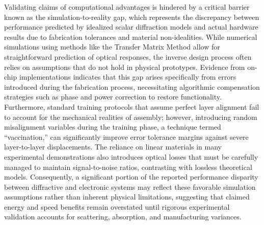 Validating claims of computational advantages is hindered by a critical barrier known as the simulation-to-reality gap, which represents the discrepancy between performance predicted by idealized scalar diffraction models and actual hardware results due to fabrication tolerances and material non-idealities. \citep{doi_10_1117_12_3013482_d44587c1} \citep{doi_10_1117_12_3084472_3a4f4f5d} While numerical simulations using methods like the Transfer Matrix Method allow for straightforward prediction of optical responses, the inverse design process often relies on assumptions that do not hold in physical prototypes. Evidence from on-chip implementations indicates that this gap arises specifically from errors introduced during the fabrication process, necessitating algorithmic compensation strategies such as phase and power correction to restore functionality. Furthermore, standard training protocols that assume perfect layer alignment fail to account for the mechanical realities of assembly; however, introducing random misalignment variables during the training phase, a technique termed ``vaccination,'' can significantly improve error tolerance margins against severe layer-to-layer displacements. \citep{doi_10_1515_nanoph_2020_0291_c4a9f42d} The reliance on linear materials in many experimental demonstrations also introduces optical losses that must be carefully managed to maintain signal-to-noise ratios, contrasting with lossless theoretical models. Consequently, a significant portion of the reported performance disparity between diffractive and electronic systems may reflect these favorable simulation assumptions rather than inherent physical limitations, suggesting that claimed energy and speed benefits remain overstated until rigorous experimental validation accounts for scattering, absorption, and manufacturing variances. \citep{doi_10_1016_j_isci_2025_112222_1f7c10f5} \citep{doi_10_1038_s41598_025_19638_8_1b2db1c9} \citep{doi_10_1515_nanoph_2020_0291_c4a9f42d} \citep{doi_10_1126_science_aat8084_e055772d} \citep{s2_94f3822c453a2ab6d44c59f1f60026acb15739af_1ae3e4a4}


